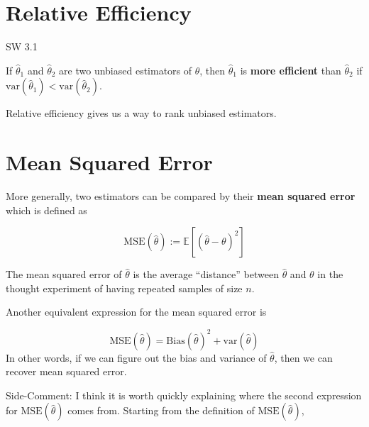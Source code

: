 \documentclass[
  letterpaper,
  DIV=11,
  numbers=noendperiod]{scrreprt}
\begin{document}
\section{Relative Efficiency}\label{relative-efficiency}

SW 3.1

If \(\hat{\theta}_1\) and \(\hat{\theta}_2\) are two unbiased estimators
of \(\theta\), then \(\hat{\theta}_1\) is \textbf{more efficient} than
\(\hat{\theta}_2\) if
\(\mathrm{var}(\hat{\theta}_1) < \mathrm{var}(\hat{\theta}_2)\).

Relative efficiency gives us a way to rank unbiased estimators.

\section{Mean Squared Error}\label{mean-squared-error}

More generally, two estimators can be compared by their \textbf{mean
squared error} which is defined as

\[
  \textrm{MSE}(\hat{\theta}) := \mathbb{E}\left[ (\hat{\theta} - \theta)^2\right]
\]

The mean squared error of \(\hat{\theta}\) is the average ``distance''
between \(\hat{\theta}\) and \(\theta\) in the thought experiment of
having repeated samples of size \(n\).

Another equivalent expression for the mean squared error is

\[
  \textrm{MSE}(\hat{\theta}) = \textrm{Bias}(\hat{\theta})^2 + \mathrm{var}(\hat{\theta})
\] In other words, if we can figure out the bias and variance of
\(\hat{\theta}\), then we can recover mean squared error.

{Side-Comment:} I think it is worth quickly explaining where the second
expression for \(\textrm{MSE}(\hat{\theta})\) comes from. Starting from
the definition of \(\textrm{MSE}(\hat{\theta})\),
\end{document}
